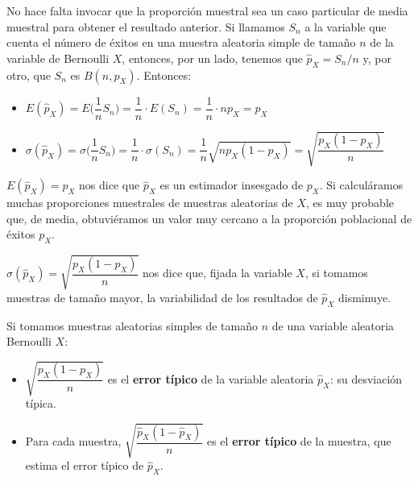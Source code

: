 \documentclass[
  spanish,
  letterpaper,
  DIV=11,
  numbers=noendperiod]{scrreprt}
\begin{document}
\begin{tcolorbox}[enhanced jigsaw, arc=.35mm, bottomrule=.15mm, bottomtitle=1mm, breakable, colback=white, colbacktitle=quarto-callout-note-color!10!white, colframe=quarto-callout-note-color-frame, coltitle=black, left=2mm, leftrule=.75mm, opacityback=0, opacitybacktitle=0.6, rightrule=.15mm, title=\textcolor{quarto-callout-note-color}{\faInfo}\hspace{0.5em}{Nota}, titlerule=0mm, toprule=.15mm, toptitle=1mm]

No hace falta invocar que la proporción muestral sea un caso particular
de media muestral para obtener el resultado anterior. Si llamamos
\(S_n\) a la variable que cuenta el número de éxitos en una muestra
aleatoria simple de tamaño \(n\) de la variable de Bernoulli \(X\),
entonces, por un lado, tenemos que \(\widehat{p}_X=S_n/n\) y, por otro,
que \(S_n\) es \(B(n,p_X)\). Entonces:

\begin{itemize}
\item
  \(E(\widehat{p}_X)=E\Big(\dfrac{1}{n}S_n\Big)=\dfrac{1}{n}\cdot E(S_n)=\dfrac{1}{n}\cdot np_X=p_X\)
\item
  \(\sigma({\widehat{p}_X})=\sigma\Big(\dfrac{1}{n}S_n\Big)=\dfrac{1}{n}\cdot \sigma(S_n)=\dfrac{1}{n} \sqrt{np_X(1-p_X)}=\sqrt{\dfrac{p_X(1-p_X)}{n}}\)
\end{itemize}

\end{tcolorbox}

\(E(\widehat{p}_X)=p_X\) nos dice que \(\widehat{p}_X\) es un estimador
insesgado de \(p_X\). Si calculáramos muchas proporciones muestrales de
muestras aleatorias de \(X\), es muy probable que, de media,
obtuviéramos un valor muy cercano a la proporción poblacional de éxitos
\(p_X\).

\(\sigma({\widehat{p}_X})=\sqrt{\dfrac{p_X(1-p_X)}{n}}\) nos dice que,
fijada la variable \(X\), si tomamos muestras de tamaño mayor, la
variabilidad de los resultados de \(\widehat{p}_X\) disminuye.

Si tomamos muestras aleatorias simples de tamaño \(n\) de una variable
aleatoria Bernoulli \(X\):

\begin{itemize}
\item
  \(\sqrt{\dfrac{p_X(1-p_X)}{n}}\) es el \textbf{error típico} de la
  variable aleatoria \(\widehat{p}_X\): su desviación típica.
\item
  Para cada muestra,
  \(\sqrt{\dfrac{\widehat{p}_X(1-\widehat{p}_X)}{n}}\) es el
  \textbf{error típico} de la muestra, que estima el error típico de
  \(\widehat{p}_X\).
\end{itemize}
\end{document}
